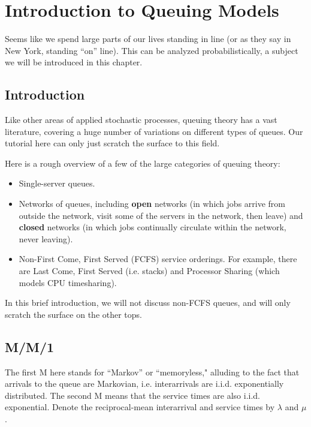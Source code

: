 \chapter{Introduction to Queuing Models}
\label{que}

Seems like we spend large parts of our lives standing in line (or as
they say in New York, standing ``on'' line).  This can be analyzed
probabilistically, a subject we will be introduced in this chapter.

\section{Introduction}

Like other areas of applied stochastic processes, queuing theory has a
vast literature, covering a huge number of variations on different types
of queues.  Our tutorial here can only just scratch the surface to this
field.

Here is a rough overview of a few of the large categories of queuing theory:

\begin{itemize}

\item Single-server queues.

\item Networks of queues, including {\bf open} networks (in which jobs
arrive from outside the network, visit some of the servers in the
network, then leave) and {\bf closed} networks (in which jobs
continually circulate within the network, never leaving).

\item Non-First Come, First Served (FCFS) service orderings.  For
example, there are Last Come, First Served (i.e. stacks) and Processor
Sharing (which models CPU timesharing).

\end{itemize}

In this brief introduction, we will not discuss non-FCFS queues, and
will only scratch the surface on the other tops.

\section{M/M/1}

The first M here stands for ``Markov'' or ``memoryless," alluding to the
fact that arrivals to the queue are Markovian, i.e. interarrivals are
i.i.d. exponentially distributed.  The second M means that the service
times are also i.i.d. exponential.  Denote the reciprocal-mean
interarrival and service times by $\lambda$ and $\mu$.

